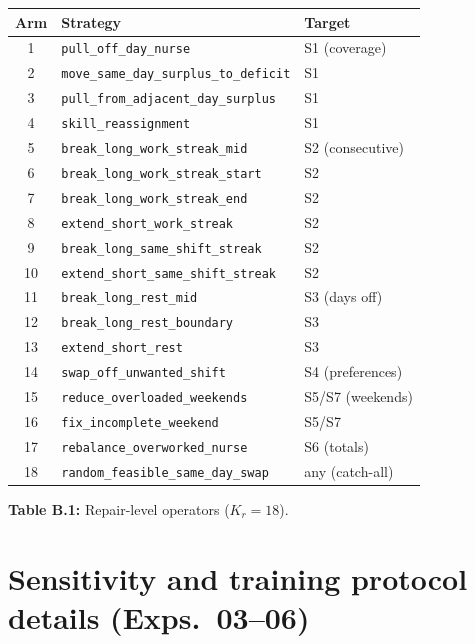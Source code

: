 \documentclass{article}
\begin{document}
\begin{center}
\small
\begin{tabular}{cll}
\toprule
Arm & Strategy & Target \\
\midrule
1  & \texttt{pull\_off\_day\_nurse}                 & S1 (coverage) \\
2  & \texttt{move\_same\_day\_surplus\_to\_deficit} & S1 \\
3  & \texttt{pull\_from\_adjacent\_day\_surplus}    & S1 \\
4  & \texttt{skill\_reassignment}                   & S1 \\
5  & \texttt{break\_long\_work\_streak\_mid}        & S2 (consecutive) \\
6  & \texttt{break\_long\_work\_streak\_start}      & S2 \\
7  & \texttt{break\_long\_work\_streak\_end}        & S2 \\
8  & \texttt{extend\_short\_work\_streak}           & S2 \\
9  & \texttt{break\_long\_same\_shift\_streak}      & S2 \\
10 & \texttt{extend\_short\_same\_shift\_streak}    & S2 \\
11 & \texttt{break\_long\_rest\_mid}                & S3 (days off) \\
12 & \texttt{break\_long\_rest\_boundary}           & S3 \\
13 & \texttt{extend\_short\_rest}                   & S3 \\
14 & \texttt{swap\_off\_unwanted\_shift}            & S4 (preferences) \\
15 & \texttt{reduce\_overloaded\_weekends}          & S5/S7 (weekends) \\
16 & \texttt{fix\_incomplete\_weekend}              & S5/S7 \\
17 & \texttt{rebalance\_overworked\_nurse}          & S6 (totals) \\
18 & \texttt{random\_feasible\_same\_day\_swap}     & any (catch-all) \\
\bottomrule
\end{tabular}
\end{center}
\begin{center}
\small\textbf{Table B.1:} Repair-level operators ($K_r = 18$).
\end{center}

\clearpage

\section{Sensitivity and training protocol details (Exps.~03--06)}
\label{app:sensitivity}
\end{document}
